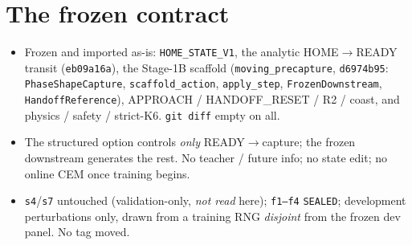 \documentclass[11pt]{article}
\newcommand{\code}[1]{\texttt{\small #1}}
\begin{document}
\section{The frozen contract}
\begin{itemize}[nosep,leftmargin=1.4em]
  \item Frozen and imported as-is: \code{HOME\_STATE\_V1}, the analytic HOME$\to$READY transit (\code{eb09a16a}), the
  Stage-1B scaffold (\code{moving\_precapture}, \code{d6974b95}: \code{PhaseShapeCapture}, \code{scaffold\_action},
  \code{apply\_step}, \code{FrozenDownstream}, \code{HandoffReference}), APPROACH / HANDOFF\_RESET / R2 / coast, and
  physics / safety / strict-K6. \code{git diff} empty on all.
  \item The structured option controls \emph{only} READY$\to$capture; the frozen downstream generates the rest. No teacher /
  future info; no state edit; no online CEM once training begins.
  \item \code{s4}/\code{s7} untouched (validation-only, \emph{not read} here); \code{f1--f4} \code{SEALED}; development
  perturbations only, drawn from a training RNG \emph{disjoint} from the frozen dev panel. No tag moved.
\end{itemize}
\end{document}
